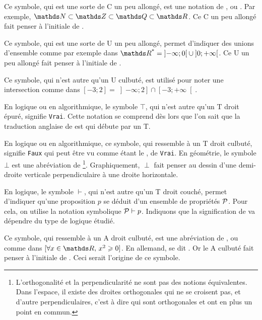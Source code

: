 
\cadre{$\subset$} Ce symbole, qui est une sorte de C un peu allongé, est une notation
de , ou . Par exemple, 
$\NN \subset \ZZ \subset \QQ \subset \RR$. Ce C un peu allongé fait penser à l'initiale
de .

\cadre{$\cup$} Ce symbole, qui est une sorte de U un peu allongé, permet d'indiquer
des unions d'ensemble comme par exemple dans 
$\RR^\text{*} = \left] -\infty ; 0 \right[ \cup \left] 0 ; +\infty \right[$.
Ce U un peu allongé fait penser à l'initiale de .

\cadre{$\cap$} Ce symbole, qui n'est autre qu'un U culbuté, est utilisé pour noter une intersection comme dans
$\left[ -3 ; 2 \right] = \left] -\infty ; 2 \right] \cap \left[ -3 ; +\infty \right[$.

\cadre{$\top$} En logique ou en algorithmique, le symbole $\top$, qui n'est autre qu'un T droit épuré, signifie \verb+Vrai+. Cette notation se comprend dès lors que l'on sait que la traduction anglaise de  est  qui débute par un T.

\cadre{$\perp$} 
En logique ou en algorithmique, ce symbole, qui ressemble à un T droit culbuté, signifie \verb+Faux+ qui peut être vu comme étant le ,  de \verb+Vrai+.
En géométrie, le symbole $\bot$ est une abréviation de  
\footnote{
	L'orthogonalité et la perpendicularité ne sont pas des notions équivalentes. Dans l'espace, il existe des droites orthogonales qui ne se croisent pas, et d'autre perpendiculaires, c'est à dire qui sont orthogonales et ont en plus un point en commun.
}.
Graphiquement, $\perp$ fait penser au dessin d'une demi-droite verticale perpendiculaire à une droite horizontale.

\cadre{$\vdash$} En logique, le symbole $\vdash$, qui n'est autre qu'un T droit couché, permet d'indiquer qu'une proposition $p$ se déduit d'un ensemble de propriétés $\cal P$. Pour cela, on utilise la notation symbolique ${\cal P} \vdash p$. Indiquons que la signification de  va dépendre du type de logique étudié.

\cadre{$\forall$} Ce symbole, qui ressemble à un A droit culbuté, est une abréviation
de , ou  comme dans
$ [ \forall x \in \RR, \, x^2 \geq 0 ] $. En allemand,  se dit .
Or le A culbuté fait penser à l'initiale de . Ceci serait l'origine
de ce symbole.


